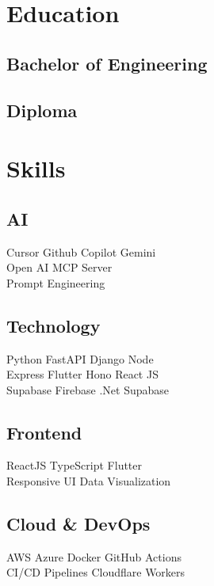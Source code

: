 \documentclass[]{deedy-resume-reversed}
\begin{document}
\begin{minipage}[t]{0.33\textwidth}

\section{Education}

\subsection{Bachelor of Engineering}
\sectionsep

\subsection{Diploma}
\sectionsep

\section{Skills}

\subsection{AI}
Cursor \textbullet Github Copilot \textbullet Gemini\\
Open AI \textbullet MCP Server \\
Prompt Engineering 
\sectionsep

\subsection{Technology}
Python \textbullet FastAPI \textbullet Django \textbullet Node \\
Express \textbullet Flutter \textbullet Hono \textbullet React JS \\
Supabase \textbullet Firebase \textbullet .Net \textbullet Supabase \\
\sectionsep

\subsection{Frontend}
ReactJS \textbullet TypeScript \textbullet Flutter \\
Responsive UI \textbullet Data Visualization \\
\sectionsep

\subsection{Cloud \& DevOps}
AWS \textbullet Azure \textbullet Docker \textbullet GitHub Actions \\
CI/CD Pipelines \textbullet Cloudflare Workers \\
\sectionsep


\end{minipage}
\end{document}
